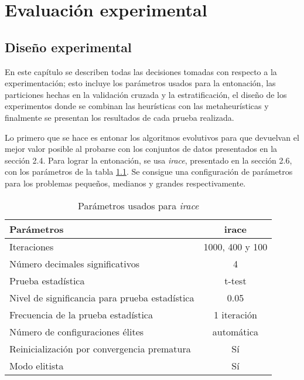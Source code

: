 \chapter{Evaluación experimental}
\label{capitulo3}

\section{Diseño experimental}

En este capítulo se describen todas las decisiones tomadas con respecto a la experimentación; esto incluye los parámetros usados para la entonación, las particiones hechas en la validación cruzada y la estratificación, el diseño de los experimentos donde se combinan las heurísticas con las metaheurísticas y finalmente se presentan los resultados de cada prueba realizada. 

Lo primero que se hace es entonar los algoritmos evolutivos para que devuelvan el mejor valor posible al probarse con los conjuntos de datos presentados en la sección 2.4. Para lograr la entonación, se usa \emph{irace}, presentado en la sección 2.6, con los parámetros de la tabla \ref{irace-param}. Se consigue una configuración de parámetros para los problemas pequeños, medianos y grandes respectivamente.

\begin{table}[]
\centering
\begin{tabular}{l c}
\hline
Parámetros & irace \\
\hline
\hline
Iteraciones                                 &  1000, 400 y 100\\
Número decimales significativos             &    4            \\
Prueba estadística                          &  t-test         \\
Nivel de significancia para prueba estadística  &  0.05           \\
Frecuencia de la prueba estadística         &    1 iteración  \\
Número de configuraciones élites            &  automática     \\
Reinicialización por convergencia prematura &     Sí          \\
Modo elitista                               &     Sí          \\

\hline
\end{tabular}
\caption{Parámetros usados para \emph{irace}}
\label{irace-param}
\end{table}

